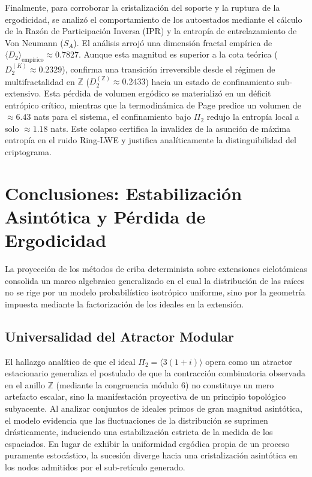 \documentclass{article}
\numberwithin{equation}{section}
\theoremstyle{plain}
\theoremstyle{definition}
\begin{document}
Finalmente, para corroborar la cristalización del soporte y la ruptura de la ergodicidad, se analizó el comportamiento de los autoestados mediante el cálculo de la Razón de Participación Inversa (IPR) y la entropía de entrelazamiento de Von Neumann ($S_A$). El análisis arrojó una dimensión fractal empírica de $\langle D_2 \rangle_{\text{empírico}} \approx 0.7827$. Aunque esta magnitud es superior a la cota teórica ($D_2^{(K)} \approx 0.2329$), confirma una transición irreversible desde el régimen de multifractalidad en $\mathbb{Z}$ ($D_2^{(\mathbb{Z})} \approx 0.2433$) \cite{Peinador2026Hamiltonian} hacia un estado de confinamiento sub-extensivo. Esta pérdida de volumen ergódico se materializó en un déficit entrópico crítico, mientras que la termodinámica de Page predice un volumen de $\approx 6.43$ nats para el sistema, el confinamiento bajo $\Pi_2$ redujo la entropía local a solo $\approx 1.18$ nats. Este colapso certifica la invalidez de la asunción de máxima entropía en el ruido Ring-LWE y justifica analíticamente la distinguibilidad del criptograma.

\section{Conclusiones: Estabilización Asintótica y Pérdida de Ergodicidad}
\label{sec:discusion_conclusiones}

La proyección de los métodos de criba determinista sobre extensiones ciclotómicas consolida un marco algebraico generalizado en el cual la distribución de las raíces no se rige por un modelo probabilístico isotrópico uniforme, sino por la geometría impuesta mediante la factorización de los ideales en la extensión.

\subsection{Universalidad del Atractor Modular}

El hallazgo analítico de que el ideal $\Pi_2 = \langle 3(1+i) \rangle$ opera como un atractor estacionario generaliza el postulado de que la contracción combinatoria observada en el anillo $\mathbb{Z}$ (mediante la congruencia módulo $6$) no constituye un mero artefacto escalar, sino la manifestación proyectiva de un principio topológico subyacente. Al analizar conjuntos de ideales primos de gran magnitud asintótica, el modelo evidencia que las fluctuaciones de la distribución se suprimen drásticamente, induciendo una estabilización estricta de la medida de los espaciados. En lugar de exhibir la uniformidad ergódica propia de un proceso puramente estocástico, la sucesión diverge hacia una cristalización asintótica en los nodos admitidos por el sub-retículo generado.
\end{document}
